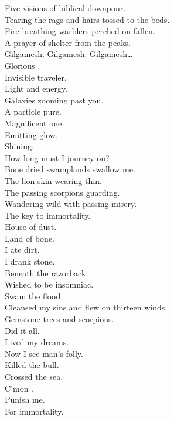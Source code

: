 Five visions of biblical downpour. \\
Tearing the rags and hairs tossed to the  beds. \\
Fire breathing warblers perched on fallen. \\
A prayer of shelter from the peaks. \\

Gilgamesh. Gilgamesh. Gilgamesh… \\

Glorious . \\
Invisible traveler. \\
Light and energy. \\
Galaxies zooming past you. \\
A particle pure. \\
Magnificent one. \\
Emitting glow. \\
Shining. \\
How long must I journey on? \\

Bone dried swamplands swallow me. \\
The lion skin wearing thin. \\
The passing scorpions guarding. \\
Wandering wild with passing misery. \\
The key to immortality. \\

House of dust. \\
Land of bone. \\
I ate dirt. \\
I drank stone. \\
Beneath the razorback. \\
Wished to be insomniac. \\
Swam the flood. \\
Cleansed my sins and flew on thirteen winds. \\
Gemstone trees and scorpions. \\
Did it all. \\
Lived my dreams. \\
Now I see man's folly. \\
Killed the bull. \\
Crossed the sea. \\
C'mon . \\
Punish me. \\
For immortality. \\

